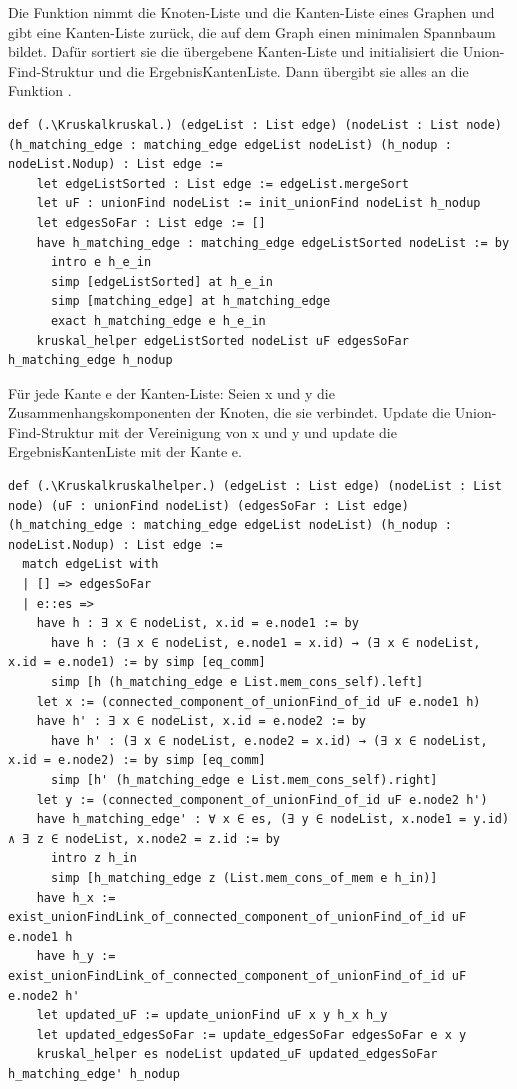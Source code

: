 \begin{definition}[\Kruskalkruskal]
  Die Funktion \Kruskalkruskal nimmt die Knoten-Liste und die Kanten-Liste eines Graphen und gibt eine Kanten-Liste zurück, die auf dem Graph einen minimalen Spannbaum bildet.
  Dafür sortiert sie die übergebene Kanten-Liste und initialisiert die Union-Find-Struktur und die ErgebnisKantenListe.
  Dann übergibt sie alles an die Funktion \Kruskalkruskalhelper.
\end{definition}
\begin{lstlisting}
def (.\Kruskalkruskal.) (edgeList : List edge) (nodeList : List node) (h_matching_edge : matching_edge edgeList nodeList) (h_nodup : nodeList.Nodup) : List edge :=
    let edgeListSorted : List edge := edgeList.mergeSort
    let uF : unionFind nodeList := init_unionFind nodeList h_nodup
    let edgesSoFar : List edge := []
    have h_matching_edge : matching_edge edgeListSorted nodeList := by
      intro e h_e_in
      simp [edgeListSorted] at h_e_in
      simp [matching_edge] at h_matching_edge
      exact h_matching_edge e h_e_in
    kruskal_helper edgeListSorted nodeList uF edgesSoFar h_matching_edge h_nodup
\end{lstlisting}



\begin{definition}[\Kruskalkruskalhelper]
  Für jede Kante e der Kanten-Liste:
  Seien x und y die Zusammenhangskomponenten der Knoten, die sie verbindet.
  Update die Union-Find-Struktur mit der Vereinigung von x und y
  und update die ErgebnisKantenListe mit der Kante e.
\end{definition}
\begin{lstlisting}
def (.\Kruskalkruskalhelper.) (edgeList : List edge) (nodeList : List node) (uF : unionFind nodeList) (edgesSoFar : List edge) (h_matching_edge : matching_edge edgeList nodeList) (h_nodup : nodeList.Nodup) : List edge :=
  match edgeList with
  | [] => edgesSoFar
  | e::es =>
    have h : ∃ x ∈ nodeList, x.id = e.node1 := by
      have h : (∃ x ∈ nodeList, e.node1 = x.id) → (∃ x ∈ nodeList, x.id = e.node1) := by simp [eq_comm]
      simp [h (h_matching_edge e List.mem_cons_self).left]
    let x := (connected_component_of_unionFind_of_id uF e.node1 h)
    have h' : ∃ x ∈ nodeList, x.id = e.node2 := by
      have h' : (∃ x ∈ nodeList, e.node2 = x.id) → (∃ x ∈ nodeList, x.id = e.node2) := by simp [eq_comm]
      simp [h' (h_matching_edge e List.mem_cons_self).right]
    let y := (connected_component_of_unionFind_of_id uF e.node2 h')
    have h_matching_edge' : ∀ x ∈ es, (∃ y ∈ nodeList, x.node1 = y.id) ∧ ∃ z ∈ nodeList, x.node2 = z.id := by
      intro z h_in
      simp [h_matching_edge z (List.mem_cons_of_mem e h_in)]
    have h_x := exist_unionFindLink_of_connected_component_of_unionFind_of_id uF e.node1 h
    have h_y := exist_unionFindLink_of_connected_component_of_unionFind_of_id uF e.node2 h'
    let updated_uF := update_unionFind uF x y h_x h_y
    let updated_edgesSoFar := update_edgesSoFar edgesSoFar e x y
    kruskal_helper es nodeList updated_uF updated_edgesSoFar h_matching_edge' h_nodup
\end{lstlisting}

